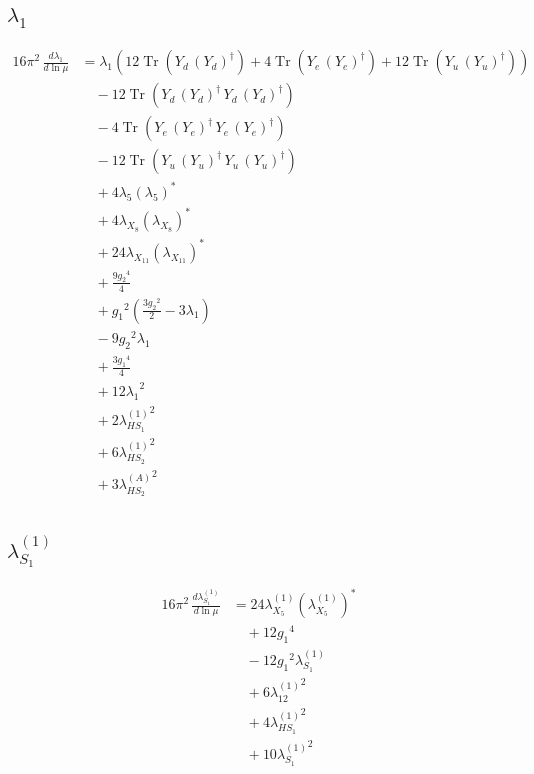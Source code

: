 \documentclass[10pt,a4paper]{article}
\begin{document}
\subsection*{$\lambda_1$}
\begin{align*}
16\pi^2\,\frac{d \lambda_1}{d\ln\mu} &={\lambda_1} (12 \operatorname{Tr}\!\left({Y_d}\,\left({Y_d}\right)^{\dagger}\right)+4 \operatorname{Tr}\!\left({Y_e}\,\left({Y_e}\right)^{\dagger}\right)+12 \operatorname{Tr}\!\left({Y_u}\,\left({Y_u}\right)^{\dagger}\right)) \\
&\quad -12 \operatorname{Tr}\!\left({Y_d}\,\left({Y_d}\right)^{\dagger}\,{Y_d}\,\left({Y_d}\right)^{\dagger}\right) \\
&\quad -4 \operatorname{Tr}\!\left({Y_e}\,\left({Y_e}\right)^{\dagger}\,{Y_e}\,\left({Y_e}\right)^{\dagger}\right) \\
&\quad -12 \operatorname{Tr}\!\left({Y_u}\,\left({Y_u}\right)^{\dagger}\,{Y_u}\,\left({Y_u}\right)^{\dagger}\right) \\
&\quad +4 {\lambda_5} \left({\lambda_5}\right)^{*} \\
&\quad +4 {\lambda_{X_{8}}} \left({\lambda_{X_{8}}}\right)^{*} \\
&\quad +24 {\lambda_{X_{11}}} \left({\lambda_{X_{11}}}\right)^{*} \\
&\quad +\frac{9 {g_2}^4}{4} \\
&\quad +{g_1}^2 \left(\frac{3 {g_2}^2}{2}-3 {\lambda_1}\right) \\
&\quad -9 {g_2}^2 {\lambda_1} \\
&\quad +\frac{3 {g_1}^4}{4} \\
&\quad +12 {\lambda_1}^2 \\
&\quad +2 {\lambda_{HS_1}^{(1)}}^2 \\
&\quad +6 {\lambda_{HS_2}^{(1)}}^2 \\
&\quad +3 {\lambda_{HS_2}^{(A)}}^2 \\
\end{align*}
\subsection*{$\lambda_{S_1}^{(1)}$}
\begin{align*}
16\pi^2\,\frac{d \lambda_{S_1}^{(1)}}{d\ln\mu} &=24 {\lambda_{X_{5}}^{(1)}} \left({\lambda_{X_{5}}^{(1)}}\right)^{*} \\
&\quad +12 {g_1}^4 \\
&\quad -12 {g_1}^2 {\lambda_{S_1}^{(1)}} \\
&\quad +6 {\lambda_{12}^{(1)}}^2 \\
&\quad +4 {\lambda_{HS_1}^{(1)}}^2 \\
&\quad +10 {\lambda_{S_1}^{(1)}}^2 \\
\end{align*}
\end{document}
